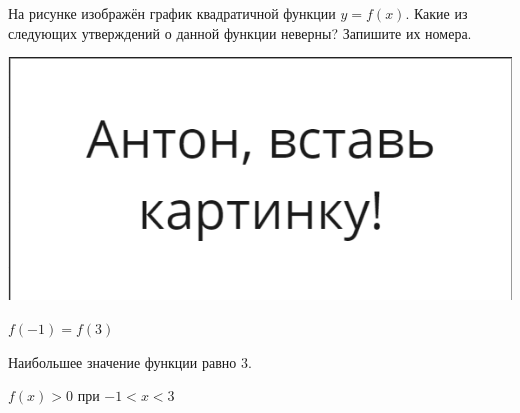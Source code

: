 \begin{class}[number=3]
\begin{listofex}
			\item 
			\begin{minipage}[t]{0.57\textwidth}
				На рисунке изображён график квадратичной функции \( y=f(x) \). Какие из следующих утверждений о данной функции неверны? Запишите их номера.
			\end{minipage}
			\begin{minipage}[c]{0.3\textwidth}
				\includegraphics[align=t, width=\textwidth]{pics/G91M4L4-1}
			\end{minipage}
			\begin{enumcols}[itemcolumns=1]
				\item \( f(-1)=f(3) \)
				\item Наибольшее значение функции равно \( 3 \).
				\item \( f(x)>0 \) при \( -1<x<3 \)
			\end{enumcols}
		

\end{listofex}
\end{class}
